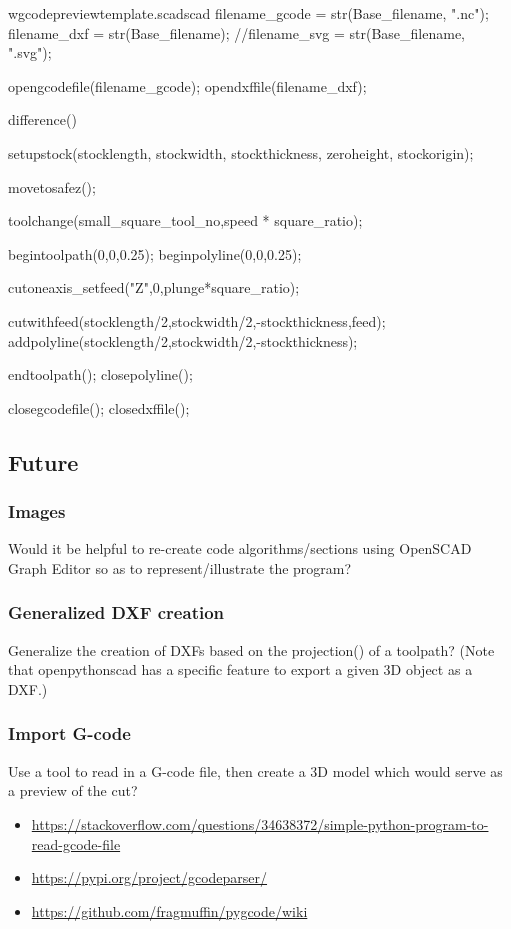 \documentclass{ltxdoc}
\begin{document}
\begin{writecode}{w}{gcodepreviewtemplate.scad}{scad}
filename_gcode = str(Base_filename, ".nc");
filename_dxf = str(Base_filename);
//filename_svg = str(Base_filename, ".svg");

opengcodefile(filename_gcode);
opendxffile(filename_dxf);

difference() {
setupstock(stocklength, stockwidth, stockthickness, zeroheight, stockorigin);

movetosafez();

toolchange(small_square_tool_no,speed * square_ratio);

begintoolpath(0,0,0.25);
beginpolyline(0,0,0.25);

cutoneaxis_setfeed("Z",0,plunge*square_ratio);

cutwithfeed(stocklength/2,stockwidth/2,-stockthickness,feed);
addpolyline(stocklength/2,stockwidth/2,-stockthickness);

endtoolpath();
closepolyline();
}

closegcodefile();
closedxffile();
\end{writecode}
\addtocounter{gcptmpl}{112}
 
\subsection{Future}

\subsubsection{Images}

Would it be helpful to re-create code algorithms/sections using OpenSCAD Graph Editor 
so as to represent/illustrate the program?

\subsubsection{Generalized DXF creation}

Generalize the creation of DXFs based on the projection() of a toolpath? (Note that openpythonscad has a specific feature to export a given 3D object as a DXF.)

\subsubsection{Import G-code}

Use a tool to read in a G-code file, then create a 3D model which would serve as a preview of the cut?

\begin{itemize}
\item \url{https://stackoverflow.com/questions/34638372/simple-python-program-to-read-gcode-file}
\item \url{https://pypi.org/project/gcodeparser/}
\item \url{https://github.com/fragmuffin/pygcode/wiki}
\end{itemize} 
 
\end{document}
